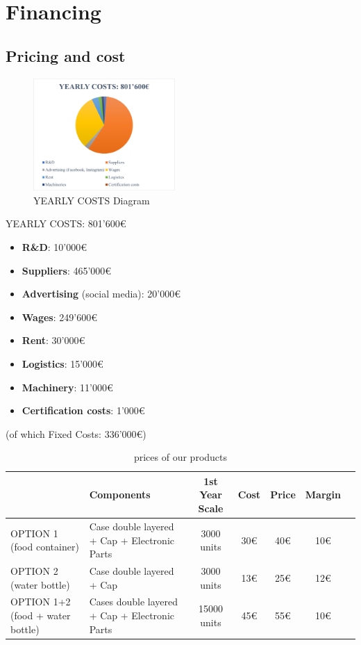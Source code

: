 \section{Financing}
\subsection{Pricing and cost}\label{pricing}
\begin{figure}
  \centering
   \includegraphics[width=0.48\textwidth]{images/costi-diagramma-torta.png}
  \caption{YEARLY COSTS Diagram}
\end{figure}
YEARLY COSTS: 801’600€\\
\begin{itemize}
\item \textbf{R\&D}: 10’000€
\item \textbf{Suppliers}: 465’000€
\item \textbf{Advertising} (social media): 20’000€
\item \textbf{Wages}: 249’600€
\item \textbf{Rent}: 30’000€
\item \textbf{Logistics}: 15’000€
\item \textbf{Machinery}: 11’000€
\item \textbf{Certification costs}: 1’000€
\end{itemize}
(of which Fixed Costs: 336’000€)
\begin{table}[H]
\centering
\caption{prices of our products}
\begin{tabular}{GGccccm{0.1\textwidth}}
\toprule
& Components & 1st Year Scale & Cost & Price & Margin\\
\hline
OPTION 1 (food container)& Case double layered + Cap + Electronic Parts & 3000 units & 30€ & 40€ & 10€\\
\hline
OPTION 2 (water bottle)& Case double layered + Cap & 3000 units & 13€ & 25€ & 12€\\
\hline
OPTION 1+2 (food + water bottle)& Cases double layered + Cap + Electronic Parts & 15000 units &45€ & 55€ & 10€\\
\bottomrule
\end{tabular}
\end{table}

